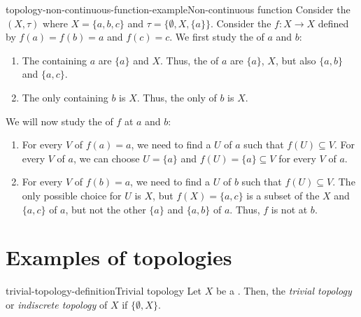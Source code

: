 \documentclass[preview]{standalone}
\begin{document}
\begin{snippetexample}{topology-non-continuous-function-example}{Non-continuous function}
    Consider the \topologicalspace \((X, \tau)\)
    where \(X = \{a, b, c\}\) and \(\tau = \{\emptyset, X, \{a\}\}\).
    Consider the \function \(f\colon X \to X\) defined by
    \(f(a) = f(b) = a\) and \(f(c) = c\).
    We first study the \neighborhood[neighborhoods] of \(a\) and \(b\):
    \begin{enumerate}
        \item The  containing \(a\)
        are \(\{a\}\) and \(X\). Thus, the \neighborhood[neighborhoods] of \(a\) are
        \(\{a\}\), \(X\), but also \(\{a, b\}\) and \(\{a, c\}\).
        \item The only  containing \(b\)
        is \(X\). Thus, the only \neighborhood of \(b\) is
        \(X\).
    \end{enumerate}
    We will now study the \topologycontinuous[continuity] of \(f\) at \(a\) and \(b\):
    \begin{enumerate}
        \item For every \neighborhood \(V\) of \(f(a) = a\),
        we need to find a \neighborhood \(U\) of \(a\) such that
        \(f(U) \subseteq V\). For every \neighborhood \(V\) of \(a\),
        we can choose \(U = \{a\}\) and \(f(U) = \{a\} \subseteq V\)
        for every \neighborhood \(V\) of \(a\).
        \item For every \neighborhood \(V\) of \(f(b) = a\),
        we need to find a \neighborhood \(U\) of \(b\) such that
        \(f(U) \subseteq V\). The only possible choice for \(U\) is \(X\),
        but \(f(X) = \{a, c\}\) is a subset of the \neighborhood[neighborhoods] \(X\)
        and \(\{a, c\}\) of \(a\), but not the other \neighborhood[neighborhoods] \(\{a\}\) and \(\{a, b\}\)
        of \(a\). Thus, \(f\) is not \topologycontinuous at \(b\).
    \end{enumerate}
\end{snippetexample}

\section{Examples of topologies}

\begin{snippetdefinition}{trivial-topology-definition}{Trivial topology}
    Let \(X\) be a \set. Then, the \emph{trivial topology}
    or \emph{indiscrete topology} of \(X\) if \(\{\emptyset, X\}\).
\end{snippetdefinition}
\end{document}
